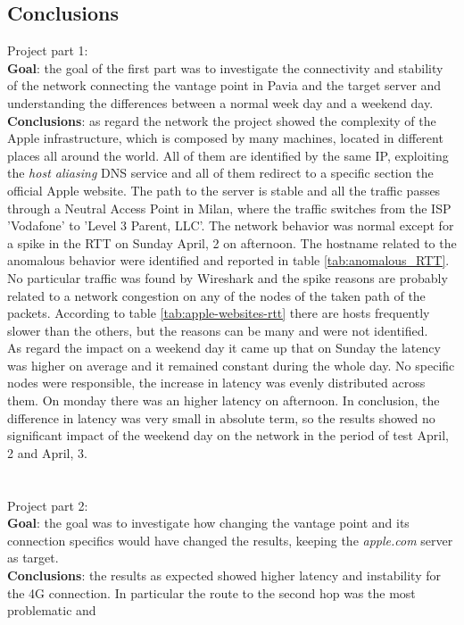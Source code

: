 \documentclass[a4paper,10pt]{article}
\begin{document}
\begin{multicols}{2}
\subsection{Conclusions}
Project part 1:\\
\textbf{Goal}:
the goal of the first part was to investigate the connectivity and stability of the network connecting the vantage point in Pavia and the target server and
understanding the differences between a normal week day and a weekend day.
\\
\textbf{Conclusions}: 
as regard the network the project showed the complexity of the Apple infrastructure, which is composed by many machines, located in different places all around the world.
All of them are identified by the same IP, exploiting the \textit{host aliasing} DNS service and all of them redirect to a specific section the official Apple website.
The path to the server is stable and all the traffic passes through a Neutral Access Point in Milan, where the traffic switches from the ISP 'Vodafone' to 'Level 3 Parent, LLC'.
The network behavior was normal except for a spike in the RTT on Sunday April, 2 on afternoon. The hostname related to the anomalous behavior were identified and
reported in table \ref{tab:anomalous_RTT}. No particular traffic was found by Wireshark and the spike reasons are probably related to a network congestion
on any of the nodes of the taken path of the packets. According to table \ref{tab:apple-websites-rtt} there are hosts frequently slower than the others, but 
the reasons can be many and were not identified.\\
As regard the impact on a weekend day it came up that on Sunday the latency was higher on average and it remained constant during the whole day. No specific nodes
were responsible, the increase in latency was evenly distributed across them. On monday there was an higher latency on afternoon. In conclusion, the difference
in latency was very small in absolute term, so the results showed no significant impact of the weekend day on the network in the period of test April, 2 and April, 3.\\
\\
\\
Project part 2:\\
\textbf{Goal}: 
the goal was to investigate how changing the vantage point and its connection specifics would have changed the results, keeping the \textit{apple.com} server as target.
\\
\textbf{Conclusions}: 
the results as expected showed higher latency and instability for the 4G connection. In particular the route to the second hop was the most problematic and

\end{multicols}
\end{document}
